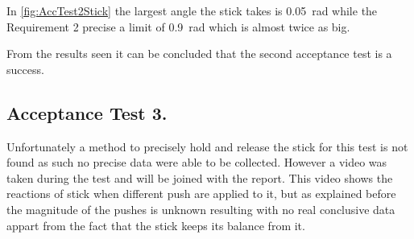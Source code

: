 In \autoref{fig:AccTest2Stick} the largest angle the stick takes is \SI{0.05}{\radian} while the Requirement 2 precise a limit of \SI{0.9}{\radian} which is almost twice as big.

From the results seen it can be concluded that the second acceptance test is a success.

\subsection{Acceptance Test 3.}

Unfortunately a method to precisely hold and release the stick for this test is not found as such no precise data were able to be collected. However a video was taken during the test and will be joined with the report. This video shows the reactions of stick when different push are applied to it, but as explained before the magnitude of the pushes is unknown resulting with no real conclusive data appart from the fact that the stick keeps its balance from it.